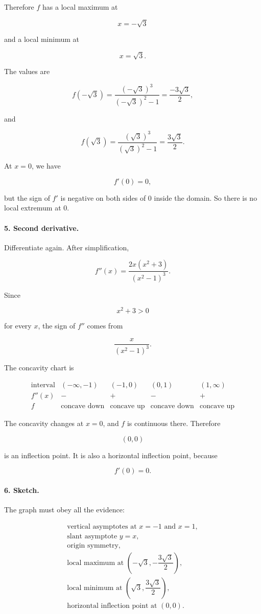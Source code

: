 Therefore \(f\) has a local maximum at

\[
x=-\sqrt3
\]

and a local minimum at

\[
x=\sqrt3.
\]

The values are

\[
f(-\sqrt3)
=
\frac{(-\sqrt3)^3}{(-\sqrt3)^2-1}
=
\frac{-3\sqrt3}{2},
\]

and

\[
f(\sqrt3)
=
\frac{(\sqrt3)^3}{(\sqrt3)^2-1}
=
\frac{3\sqrt3}{2}.
\]

At \(x=0\), we have

\[
f'(0)=0,
\]

but the sign of \(f'\) is negative on both sides of \(0\) inside the domain.  So there
is no local extremum at \(0\).

\paragraph{5. Second derivative.}
Differentiate again.  After simplification,

\[
f''(x)=\frac{2x(x^2+3)}{(x^2-1)^3}.
\]

Since

\[
x^2+3>0
\]

for every \(x\), the sign of \(f''\) comes from

\[
\frac{x}{(x^2-1)^3}.
\]

The concavity chart is

\[
\begin{array}{c|cccc}
\text{interval} & (-\infty,-1) & (-1,0) & (0,1) & (1,\infty) \\ \hline
f''(x) & - & + & - & + \\
f & \text{concave down} & \text{concave up} & \text{concave down} & \text{concave up}
\end{array}
\]

The concavity changes at \(x=0\), and \(f\) is continuous there.  Therefore

\[
(0,0)
\]

is an inflection point.  It is also a horizontal inflection point, because

\[
f'(0)=0.
\]

\paragraph{6. Sketch.}
The graph must obey all the evidence:

\[
\begin{array}{l}
\text{vertical asymptotes at }x=-1\text{ and }x=1,\\
\text{slant asymptote }y=x,\\
\text{origin symmetry,}\\
\text{local maximum at }\left(-\sqrt3,-\dfrac{3\sqrt3}{2}\right),\\[6pt]
\text{local minimum at }\left(\sqrt3,\dfrac{3\sqrt3}{2}\right),\\[6pt]
\text{horizontal inflection point at }(0,0).
\end{array}
\]

